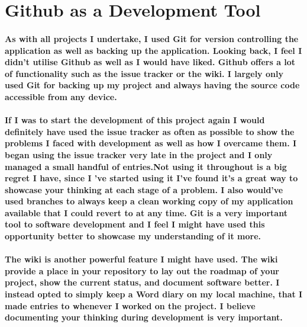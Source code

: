 \section{Github as a Development Tool}
\paragraph{As with all projects I undertake, I used Git for version controlling the application as well as backing up the application. Looking back, I feel I didn't utilise Github as well as I would have liked. Github offers a lot of functionality such as the issue tracker or the wiki. I largely only used Git for backing up my project and always having the source code accessible from any device.}
\paragraph{If I was to start the development of this project again I would definitely have used the issue tracker as often as possible to show the problems I faced with development as well as how I overcame them. I began using the issue tracker very late in the project and I only managed a small handful of entries.Not using it throughout is a  big regret I have, since I 've started using it I've found it's a great way to showcase your thinking at each stage of a problem. I also would've used branches to always keep a clean working copy of my application available that I could revert to at any time. Git is a very important tool to software development and I feel I might have used this opportunity better to showcase my understanding of it more.}
\paragraph{The wiki is another powerful feature I might have used. The wiki provide a place in your repository to lay out the roadmap of your project, show the current status, and document software better. I instead opted to simply keep a Word diary on my local machine, that I made entries to whenever I worked on the project. I believe documenting your thinking during development is very important.}
